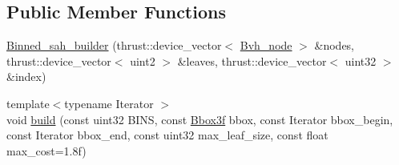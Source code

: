 \subsection*{\-Public \-Member \-Functions}
\begin{DoxyCompactItemize}
\item 
\hyperlink{structnih_1_1cuda_1_1_binned__sah__builder_aa63d7a78d801ae4bf48f61cc84733de8}{\-Binned\-\_\-sah\-\_\-builder} (thrust\-::device\-\_\-vector$<$ \hyperlink{structnih_1_1_bvh__node}{\-Bvh\-\_\-node} $>$ \&nodes, thrust\-::device\-\_\-vector$<$ uint2 $>$ \&leaves, thrust\-::device\-\_\-vector$<$ uint32 $>$ \&index)
\item 
{\footnotesize template$<$typename Iterator $>$ }\\void \hyperlink{structnih_1_1cuda_1_1_binned__sah__builder_a5fd96275420b12b971605663dc19b169}{build} (const uint32 \-B\-I\-N\-S, const \hyperlink{structnih_1_1_bbox}{\-Bbox3f} bbox, const \-Iterator bbox\-\_\-begin, const \-Iterator bbox\-\_\-end, const uint32 max\-\_\-leaf\-\_\-size, const float max\-\_\-cost=1.\-8f)
\end{DoxyCompactItemize}
